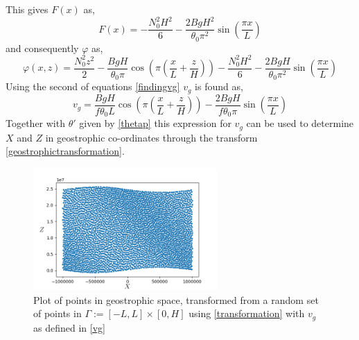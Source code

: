 This gives $F(x)$ as,
\begin{equation*}
	F(x) = -\frac{N_0^2H^2}{6} - \frac{2BgH^2}{\theta_0\pi^2}\sin\left(\frac{\pi x}{L}\right)
\end{equation*}
and consequently $\varphi$ as,
\begin{equation}
	\varphi(x,z) = \frac{N_0^2z^2}{2} - \frac{BgH}{\theta_0\pi}\cos\left(\pi\left(\frac{x}{L}+\frac{z}{H}\right)\right)-\frac{N_0^2H^2}{6} - \frac{2BgH}{\theta_0\pi^2}\sin\left(\frac{\pi x}{L}\right)
\end{equation}
Using the second of equations \ref{findingvg} $v_g$ is found as,
\begin{equation}
	v_g = \frac{BgH}{f\theta_0L}\cos\left(\pi\left(\frac{x}{L}+\frac{z}{H}\right)\right)- \frac{2BgH}{f\theta_0\pi}\sin\left(\frac{\pi x}{L}\right)
	\label{vg}
\end{equation}
Together with $\theta'$ given by \ref{thetap} this expression for $v_g$ can be used to determine $X$ and $Z$ in geostrophic co-ordinates through the transform \ref{geostrophictransformation}.
\begin{figure}[h]
	\centering
	\includegraphics[width=7cm]{project/gpoints}
	\caption[Plot of Points in Geostrophic Space]{Plot of points in geostrophic space, transformed from a random set of points in $\Gamma := [-L,L] \times [0,H]$ using \ref{transformation} with $v_g$ as defined in \ref{vg}}
	\label{fig:gpoints}
\end{figure}

